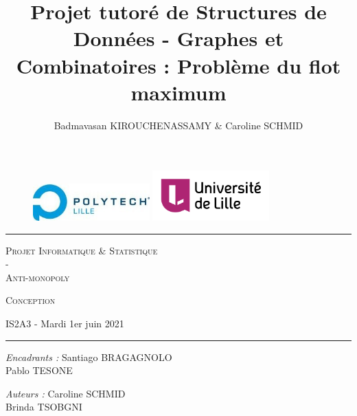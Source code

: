 \documentclass[11pt, a4paper]{report}
\author{Badmavasan KIROUCHENASSAMY \& Caroline SCHMID}
\date{}
\title{Projet tutoré de Structures de Données - Graphes et Combinatoires : Problème du flot maximum}
\begin{document}
	\begin{titlepage}
		\begin{center}
			
			\vspace*{1cm}
			
			\begin{figure}[h]
				\centering
				\includegraphics[width=0.4\textwidth]{images/LOGO_Polytech-lille.jpg}
				\hspace{2cm}
				\includegraphics[width=0.4\textwidth]{images/logo_ulille_transparent.png}
			\end{figure}
			
			\vspace*{2cm}
			
			\rule{1\textwidth}{.8pt}
			
			\LARGE{\textsc{Projet Informatique \& Statistique\\-\\Anti-monopoly}}
			
			\vspace*{1cm}
			
			\LARGE{\textsc{Conception}}
			\vspace*{1cm}
			
			\small{IS2A3 - Mardi 1er juin 2021}
			
			\vspace*{0.5cm}
			\rule{1\textwidth}{.10pt}
		
			\vspace*{2.352cm}
			
			\large{\textit{Encadrants :} Santiago BRAGAGNOLO\\Pablo TESONE}
			
			\vspace*{0.1cm}	        
			
			\large{\textit{Auteurs :} {Caroline SCHMID\\Brinda TSOBGNI}}
			
			
			
			
		\end{center}
		
	\end{titlepage}
	
\end{document}
